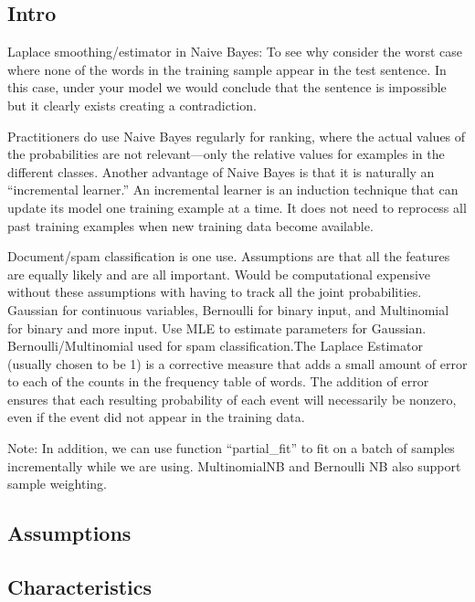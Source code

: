 \documentclass[]{book}
\begin{document}
\hypertarget{intro-10}{%
\subsection{Intro}\label{intro-10}}

Laplace smoothing/estimator in Naive Bayes: To see why consider the worst case where none of the words in the training sample appear in the test sentence. In this case, under your model we would conclude that the sentence is impossible but it clearly exists creating a contradiction.

Practitioners do use Naive Bayes regularly for ranking, where the actual values of the probabilities are not relevant---only the relative values for examples in the different classes. Another advantage of Naive Bayes is that it is naturally an ``incremental learner.'' An incremental learner is an induction technique that can update its model one training example at a time. It does not need to reprocess all past training examples when new training data become available.

Document/spam classification is one use. Assumptions are that all the features are equally likely and are all important. Would be computational expensive without these assumptions with having to track all the joint probabilities. Gaussian for continuous variables, Bernoulli for binary input, and Multinomial for binary and more input. Use MLE to estimate parameters for Gaussian. Bernoulli/Multinomial used for spam classification.The Laplace Estimator (usually chosen to be 1) is a corrective measure that adds a small amount of error to each of the counts in the frequency table of words. The addition of error ensures that each resulting probability of each event will necessarily be nonzero, even if the event did not appear in the training data.

Note: In addition, we can use function ``partial\_fit'' to fit on a batch of samples incrementally while we are using. MultinomialNB and Bernoulli NB also support sample weighting.

\hypertarget{assumptions-10}{%
\subsection{Assumptions}\label{assumptions-10}}

\hypertarget{characteristics-9}{%
\subsection{Characteristics}\label{characteristics-9}}
\end{document}
